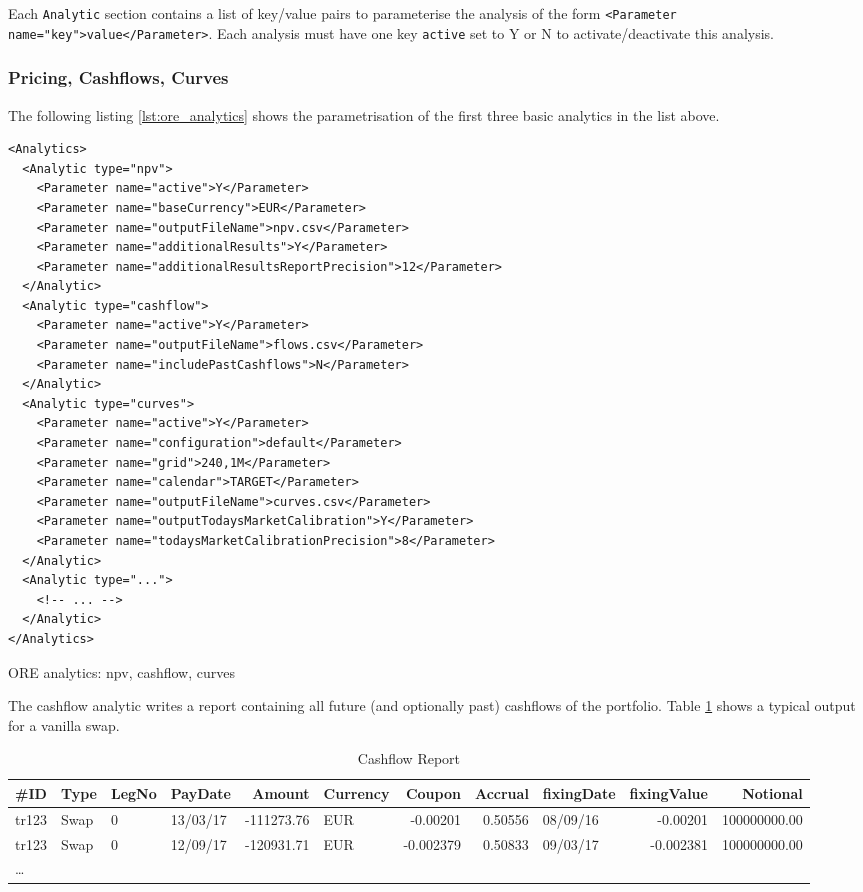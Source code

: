 Each {\tt Analytic} section contains a list of key/value pairs to parameterise the analysis of the form {\tt <Parameter
  name="key">value</Parameter>}. Each analysis must have one key {\tt active} set to Y or N to activate/deactivate this
analysis.

\subsubsection{Pricing, Cashflows, Curves}

The following listing \ref{lst:ore_analytics} shows the parametrisation of the first three basic analytics in
the list above.

\begin{listing}[H]
\begin{verbatim}
<Analytics>
  <Analytic type="npv">
    <Parameter name="active">Y</Parameter>
    <Parameter name="baseCurrency">EUR</Parameter>
    <Parameter name="outputFileName">npv.csv</Parameter>
    <Parameter name="additionalResults">Y</Parameter>
    <Parameter name="additionalResultsReportPrecision">12</Parameter>
  </Analytic>
  <Analytic type="cashflow">
    <Parameter name="active">Y</Parameter>
    <Parameter name="outputFileName">flows.csv</Parameter>
    <Parameter name="includePastCashflows">N</Parameter>
  </Analytic>
  <Analytic type="curves">
    <Parameter name="active">Y</Parameter>
    <Parameter name="configuration">default</Parameter>
    <Parameter name="grid">240,1M</Parameter>
    <Parameter name="calendar">TARGET</Parameter>
    <Parameter name="outputFileName">curves.csv</Parameter>
    <Parameter name="outputTodaysMarketCalibration">Y</Parameter>
    <Parameter name="todaysMarketCalibrationPrecision">8</Parameter>
  </Analytic>
  <Analytic type="...">
    <!-- ... -->
  </Analytic>
</Analytics>
\end{verbatim}
\caption{ORE analytics: npv, cashflow, curves}
\label{lst:ore_analytics}
\end{listing}

The cashflow analytic writes a report containing all future (and optionally past) cashflows of the portfolio. Table \ref{cashflowreport} shows
a typical output for a vanilla swap.

\begin{table}[hbt]
\scriptsize
\begin{center}
  \begin{tabular}{l|l|l|l|r|l|r|r|l|r|r}
\hline
\#ID & Type & LegNo & PayDate & Amount & Currency & Coupon & Accrual & fixingDate & fixingValue & Notional \\
\hline
\hline
tr123 & Swap & 0 & 13/03/17 & -111273.76 & EUR & -0.00201 & 0.50556 & 08/09/16 & -0.00201 & 100000000.00 \\
tr123 & Swap & 0 & 12/09/17 & -120931.71 & EUR & -0.002379 & 0.50833 & 09/03/17 & -0.002381 & 100000000.00 \\
\ldots
\end{tabular}
\caption{Cashflow Report}
\label{cashflowreport}
\end{center}
\end{table}

